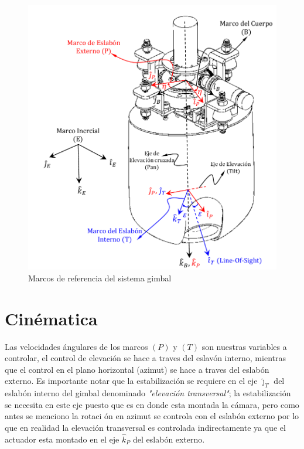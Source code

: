 \begin{figure}[thpb]
      \centering
      \includegraphics[scale=0.7]{img/Gimbal_Frames.pdf}
      \caption{Marcos de referencia del sistema gimbal}
      \label{fig:RefFra}
   \end{figure}

\section{Cin\'{e}matica}

Las velocidades \'{a}ngulares de los marcos $\left( P\right) $ y $\left(
T\right) $ son nuestras variables a controlar, el control de elevaci\'{o}n
se hace a traves del eslav\'{o}n interno, mientras que el control en el
plano horizontal (azimut) se hace a traves del eslab\'{o}n externo. Es
importante notar que la estabilizaci\'{o}n se requiere en el eje $\hat{\jmath%
}_{T}$ del eslab\'{o}n interno del gimbal denominado \textit{"elevaci\'{o}n
transversal"}; la estabilizaci\'{o}n se necesita en este eje puesto que es
en donde esta montada la c\'{a}mara, pero como antes se menciono la rotaci%
\'{o}n en azimut se controla con el eslab\'{o}n externo por lo que en
realidad la elevaci\'{o}n transversal es controlada indirectamente ya que el actuador esta montado en el eje $\hat{k}_{P}$ del eslab\'{o}n externo.

